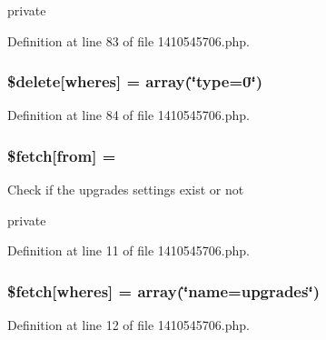 private 

Definition at line 83 of file 1410545706.\+php.

\subsubsection[{\texorpdfstring{\$delete}{$delete}}]{\setlength{\rightskip}{0pt plus 5cm}\$delete\mbox{[}\textquotesingle{}wheres\textquotesingle{}\mbox{]} = array(\char`\"{}type=\textquotesingle{}0\textquotesingle{}\char`\"{})}\hypertarget{1410545706_8php_a9bef9b9c519ccfae44ff986580419667}{}\label{1410545706_8php_a9bef9b9c519ccfae44ff986580419667}


Definition at line 84 of file 1410545706.\+php.

\subsubsection[{\texorpdfstring{\$fetch}{$fetch}}]{\setlength{\rightskip}{0pt plus 5cm}\$fetch\mbox{[}\textquotesingle{}from\textquotesingle{}\mbox{]} = \textquotesingle{}}\hypertarget{1410545706_8php_abbaa0ea36be5869d572c40498afa2bd6}{}\label{1410545706_8php_abbaa0ea36be5869d572c40498afa2bd6}
Check if the upgrades settings exist or not

private 

Definition at line 11 of file 1410545706.\+php.

\subsubsection[{\texorpdfstring{\$fetch}{$fetch}}]{\setlength{\rightskip}{0pt plus 5cm}\$fetch\mbox{[}\textquotesingle{}wheres\textquotesingle{}\mbox{]} = array(\char`\"{}name=\textquotesingle{}upgrades\textquotesingle{}\char`\"{})}\hypertarget{1410545706_8php_ac72c925d8ad9ab6b9bf7c7a1401230bb}{}\label{1410545706_8php_ac72c925d8ad9ab6b9bf7c7a1401230bb}


Definition at line 12 of file 1410545706.\+php.

